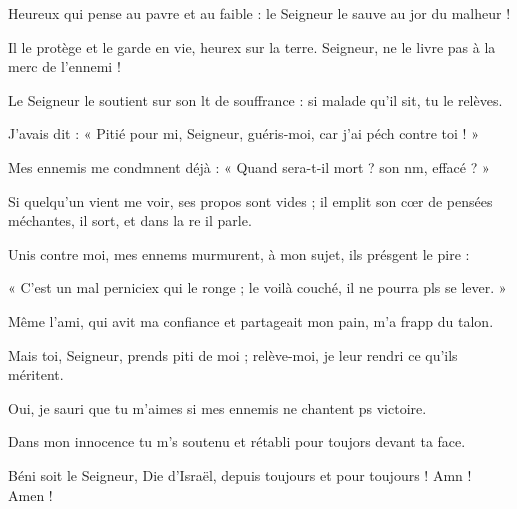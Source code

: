 \item Heureux qui pense au pavre et au faible :\psstar{} le Seigneur le sauve au jor du malheur !
\item Il le protège et le garde en vie, heurex sur la terre.\psstar{} Seigneur, ne le livre pas à la merc de l’ennemi !
\item Le Seigneur le soutient sur son lt de souffrance :\psstar{} si malade qu’il sit, tu le relèves.
\item J’avais dit : « Pitié pour mi, Seigneur,\psstar{} guéris-moi, car j’ai péch contre toi ! »
\item Mes ennemis me condmnent déjà :\psstar{} « Quand sera-t-il mort ? son nm, effacé ? »
\item Si quelqu’un vient me voir, ses propos sont vides ;\pscross{} il emplit son cœr de pensées méchantes,\psstar{} il sort, et dans la re il parle.
\item Unis contre moi, mes ennems murmurent,\psstar{} à mon sujet, ils présgent le pire :
\item « C’est un mal perniciex qui le ronge ;\psstar{} le voilà couché, il ne pourra pls se lever. »
\item Même l’ami, qui avit ma confiance\psstar{} et partageait mon pain, m’a frapp du talon.
\item Mais toi, Seigneur, prends piti de moi ;\psstar{} relève-moi, je leur rendri ce qu’ils méritent.
\item Oui, je sauri que tu m’aimes\psstar{} si mes ennemis ne chantent ps victoire.
\item Dans mon innocence tu m’s soutenu\psstar{} et rétabli pour toujors devant ta face.
\item Béni soit le Seigneur, Die d’Israël,\psstar{} depuis toujours et pour toujours ! Amn ! Amen !